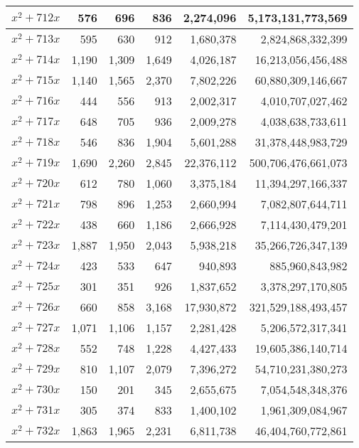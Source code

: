 \documentclass[a4paper]{amsproc}
\theoremstyle{plain}
\begin{document}
\begin{longtable}{ | l | r | r | r | r | r | }
$x^2 + 712x$ & 576 & 696 & 836 & 2{,}274{,}096 & 5{,}173{,}131{,}773{,}569 \\ \hline
$x^2 + 713x$ & 595 & 630 & 912 & 1{,}680{,}378 & 2{,}824{,}868{,}332{,}399 \\ \hline
$x^2 + 714x$ & 1{,}190 & 1{,}309 & 1{,}649 & 4{,}026{,}187 & 16{,}213{,}056{,}456{,}488 \\ \hline
$x^2 + 715x$ & 1{,}140 & 1{,}565 & 2{,}370 & 7{,}802{,}226 & 60{,}880{,}309{,}146{,}667 \\ \hline
$x^2 + 716x$ & 444 & 556 & 913 & 2{,}002{,}317 & 4{,}010{,}707{,}027{,}462 \\ \hline
$x^2 + 717x$ & 648 & 705 & 936 & 2{,}009{,}278 & 4{,}038{,}638{,}733{,}611 \\ \hline
$x^2 + 718x$ & 546 & 836 & 1{,}904 & 5{,}601{,}288 & 31{,}378{,}448{,}983{,}729 \\ \hline
$x^2 + 719x$ & 1{,}690 & 2{,}260 & 2{,}845 & 22{,}376{,}112 & 500{,}706{,}476{,}661{,}073 \\ \hline
$x^2 + 720x$ & 612 & 780 & 1{,}060 & 3{,}375{,}184 & 11{,}394{,}297{,}166{,}337 \\ \hline
$x^2 + 721x$ & 798 & 896 & 1{,}253 & 2{,}660{,}994 & 7{,}082{,}807{,}644{,}711 \\ \hline
$x^2 + 722x$ & 438 & 660 & 1{,}186 & 2{,}666{,}928 & 7{,}114{,}430{,}479{,}201 \\ \hline
$x^2 + 723x$ & 1{,}887 & 1{,}950 & 2{,}043 & 5{,}938{,}218 & 35{,}266{,}726{,}347{,}139 \\ \hline
$x^2 + 724x$ & 423 & 533 & 647 & 940{,}893 & 885{,}960{,}843{,}982 \\ \hline
$x^2 + 725x$ & 301 & 351 & 926 & 1{,}837{,}652 & 3{,}378{,}297{,}170{,}805 \\ \hline
$x^2 + 726x$ & 660 & 858 & 3{,}168 & 17{,}930{,}872 & 321{,}529{,}188{,}493{,}457 \\ \hline
$x^2 + 727x$ & 1{,}071 & 1{,}106 & 1{,}157 & 2{,}281{,}428 & 5{,}206{,}572{,}317{,}341 \\ \hline
$x^2 + 728x$ & 552 & 748 & 1{,}228 & 4{,}427{,}433 & 19{,}605{,}386{,}140{,}714 \\ \hline
$x^2 + 729x$ & 810 & 1{,}107 & 2{,}079 & 7{,}396{,}272 & 54{,}710{,}231{,}380{,}273 \\ \hline
$x^2 + 730x$ & 150 & 201 & 345 & 2{,}655{,}675 & 7{,}054{,}548{,}348{,}376 \\ \hline
$x^2 + 731x$ & 305 & 374 & 833 & 1{,}400{,}102 & 1{,}961{,}309{,}084{,}967 \\ \hline
$x^2 + 732x$ & 1{,}863 & 1{,}965 & 2{,}231 & 6{,}811{,}738 & 46{,}404{,}760{,}772{,}861 \\ \hline

\end{longtable}
\end{document}
